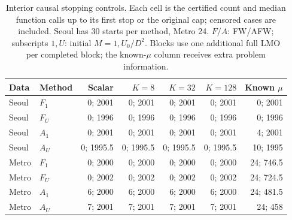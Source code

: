 \begin{table}[htbp]
\centering\small
\caption{Interior causal stopping controls. Each cell is the certified count and median function calls up to its first stop or the original cap; censored cases are included. Seoul has 30 starts per method, Metro 24. $F/A$: FW/AFW; subscripts $1,U$: initial $M=1,U_0/D^2$. Blocks use one additional full LMO per completed block; the known-$\mu$ column receives extra problem information.}
\label{tab:certificates}
\begin{tabular}{llrrrrr}
\hline
Data & Method & Scalar & $K=8$ & $K=32$ & $K=128$ & Known $\mu$ \\
\hline
Seoul & $F_1$ & 0; 2001 & 0; 2001 & 0; 2001 & 0; 2001 & 0; 2001 \\
Seoul & $F_U$ & 0; 1996 & 0; 1996 & 0; 1996 & 0; 1996 & 0; 1996 \\
Seoul & $A_1$ & 0; 2001 & 0; 2001 & 0; 2001 & 0; 2001 & 4; 2001 \\
Seoul & $A_U$ & 0; 1995.5 & 0; 1995.5 & 0; 1995.5 & 0; 1995.5 & 10; 1995 \\
\hline
Metro & $F_1$ & 0; 2000 & 0; 2000 & 0; 2000 & 0; 2000 & 24; 746.5 \\
Metro & $F_U$ & 0; 2002 & 0; 2002 & 0; 2002 & 0; 2002 & 24; 724.5 \\
Metro & $A_1$ & 6; 2000 & 6; 2000 & 6; 2000 & 6; 2000 & 24; 481.5 \\
Metro & $A_U$ & 7; 2001 & 7; 2001 & 7; 2001 & 7; 2001 & 24; 458 \\
\hline
\end{tabular}
\end{table}
